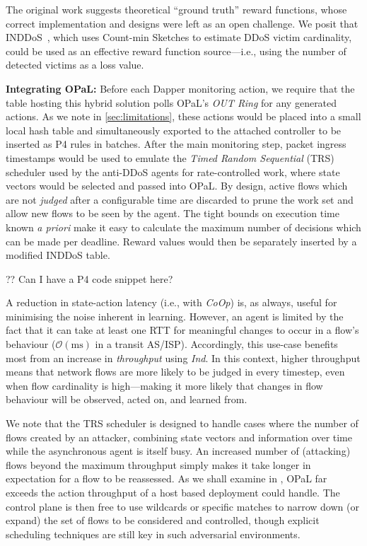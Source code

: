 \documentclass[sigconf,natbib=false]{acmart}
\newcommand{\fakepara}[1]{\noindent\textbf{#1:}}
\newcommand{\approachshort}{OPaL}
\newcommand{\Coopfw}{\emph{CoOp}}
\newcommand{\Indfw}{\emph{Ind}}
\begin{document}
The original work suggests theoretical ``ground truth'' reward functions, whose correct implementation and designs were left as an open challenge. 
We posit that INDDoS~\parencite{tnms-ddos-victim-ident}, which uses Count-min Sketches to estimate DDoS victim cardinality, could be used as an effective reward function source---i.e., using the number of detected victims as a loss value.

\fakepara{Integrating \approachshort}
Before each Dapper monitoring action, we require that the table hosting this hybrid solution polls \approachshort{}'s \emph{OUT Ring} for any generated actions.
As we note in \cref{sec:limitations}, these actions would be placed into a small local hash table and simultaneously exported to the attached controller to be inserted as P4 rules in batches.
After the main monitoring step, packet ingress timestamps would be used to emulate the \emph{Timed Random Sequential} (TRS) scheduler used by the anti-DDoS agents for rate-controlled work, where state vectors would be selected and passed into \approachshort.
By design, active flows which are not \emph{judged} after a configurable time are discarded to prune the work set and allow new flows to be seen by the agent.
The tight bounds on execution time known \emph{a priori} make it easy to calculate the maximum number of decisions which can be made per deadline.
Reward values would then be separately inserted by a modified INDDoS table.

?? Can I have a P4 code snippet here?

A reduction in state-action latency (i.e., with \Coopfw) is, as always, useful for minimising the noise inherent in learning.
However, an agent is limited by the fact that it can take at least one RTT for meaningful changes to occur in a flow's behaviour ($\mathcal{O}{\left(\si{\milli\second}\right)}$ in a transit AS/ISP).
Accordingly, this use-case benefits most from an increase in \emph{throughput} using \Indfw{}.
In this context, higher throughput means that network flows are more likely to be judged in every timestep, even when flow cardinality is high---making it more likely that changes in flow behaviour will be observed, acted on, and learned from.

We note that the TRS scheduler is designed to handle cases where the number of flows created by an attacker, combining state vectors and information over time while the asynchronous agent is itself busy.
An increased number of (attacking) flows beyond the maximum throughput simply makes it take longer in expectation for a flow to be reassessed.
As we shall examine in , \approachshort{} far exceeds the action throughput of a host based deployment could handle.
The control plane is then free to use wildcards or specific matches to narrow down (or expand) the set of flows to be considered and controlled, though explicit scheduling techniques are still key in such adversarial environments.
\end{document}
